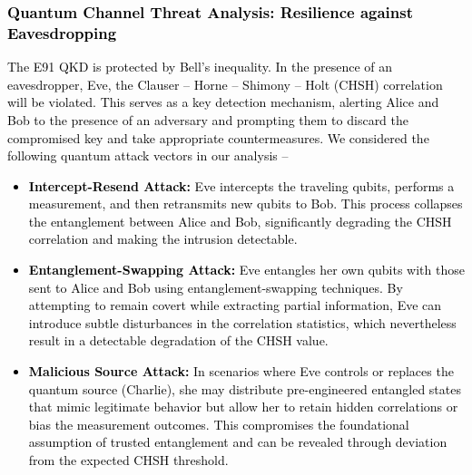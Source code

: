 \documentclass[a4paper]{cas-sc}
\begin{document}
\subsubsection{\textcolor{black}{Quantum Channel Threat Analysis: Resilience against Eavesdropping}}
\textcolor{black}{The E91 QKD is protected by Bell's inequality. In the presence of an eavesdropper, Eve, the Clauser -- Horne -- Shimony -- Holt (CHSH) correlation \cite{PhysRevLett.23.880} will be violated. This serves as a key detection mechanism, alerting Alice and Bob to the presence of an adversary and prompting them to discard the compromised key and take appropriate countermeasures. We considered the following quantum attack vectors in our analysis --
    \begin{itemize}
        \item \textbf{Intercept-Resend Attack:} Eve intercepts the traveling qubits, performs a measurement, and then retransmits new qubits to Bob. This process collapses the entanglement between Alice and Bob, significantly degrading the CHSH correlation and making the intrusion detectable.
        \item \textbf{Entanglement-Swapping Attack:} Eve entangles her own qubits with those sent to Alice and Bob using entanglement-swapping techniques. By attempting to remain covert while extracting partial information, Eve can introduce subtle disturbances in the correlation statistics, which nevertheless result in a detectable degradation of the CHSH value.
        \item  \textbf{Malicious Source Attack:} In scenarios where Eve controls or replaces the quantum source (Charlie), she may distribute pre-engineered entangled states that mimic legitimate behavior but allow her to retain hidden correlations or bias the measurement outcomes. This compromises the foundational assumption of trusted entanglement and can be revealed through deviation from the expected CHSH threshold.
    \end{itemize}}
\end{document}
